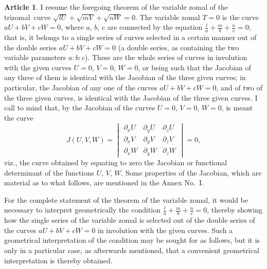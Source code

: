 \documentclass[11pt,a4paper]{article}
\theoremstyle{definition}
\newtheorem{art}{Article}
\newcommand{\trizomal}{trizomal}
\begin{document}
\begin{art}
I resume the foregoing theorem of the variable zomal of the \trizomal\ curve $\sqrt{lU} + \sqrt{mV} + \sqrt{nW} = 0$. The variable zomal $T = 0$ is the curve $aU + bV + cW = 0$, where $a$, $b$, $c$ are connected by the equation $\tfrac{l}{a} + \tfrac{m}{b} + \tfrac{n}{c} = 0$; that is, it belongs to a single series of curves selected in a certain manner out of the double series $aU + bV + cW = 0$ (a double series, as containing the two variable parameters $a : b : c$). These are the whole series of curves in involution with the given curves $U = 0$, $V = 0$, $W = 0$, or being such that the Jacobian of any three of them is identical with the Jacobian of the three given curves; in particular, the Jacobian of any one of the curves $aU + bV + cW = 0$, and of two of the three given curves, is identical with the Jacobian of the three given curves. I call to mind that, by the Jacobian of the curves $U = 0$, $V = 0$, $W = 0$, is meant the curve
\[
J(U, V, W) = \begin{vmatrix}
\partial_{x}U & \partial_{y}U & \partial_{z}U \\
\partial_{x}V & \partial_{y}V & \partial_{z}V \\
\partial_{x}W & \partial_{y}W & \partial_{z}W
\end{vmatrix} = 0,
\]
viz., the curve obtained by equating to zero the Jacobian or functional determinant of the functions $U$, $V$, $W$. Some properties of the Jacobian, which are material as to what follows, are mentioned in the Annex No.\ I.

For the complete statement of the theorem of the variable zomal, it would be necessary to interpret geometrically the condition $\tfrac{l}{a} + \tfrac{m}{b} + \tfrac{n}{c} = 0$, thereby showing how the single series of the variable zomal is selected out of the double series of the curves $aU + bV + cW = 0$ in involution with the given curves. Such a geometrical interpretation of the condition may be sought for as follows, but it is only in a particular case, as afterwards mentioned, that a convenient geometrical interpretation is thereby obtained.
\end{art}
\end{document}
